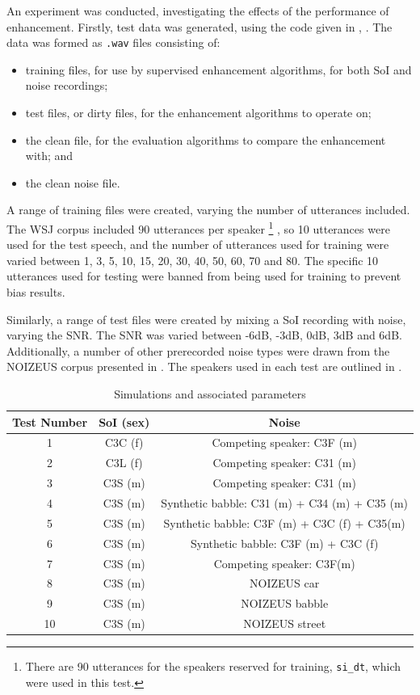 An experiment was conducted, investigating the effects of the performance
of enhancement. Firstly, test data was generated, using the code given
in , \textit{}.
The data was formed as \lstinline[language=bash]!.wav! files consisting
of:
\begin{itemize}
\item training files, for use by supervised enhancement algorithms, for
both \ac{SoI} and noise recordings;
\item test files, or dirty files, for the enhancement algorithms to operate
on;
\item the clean file, for the evaluation algorithms to compare the enhancement
with; and
\item the clean noise file.
\end{itemize}
A range of training files were created, varying the number of utterances
included. The \ac{WSJ} corpus included 90 utterances per speaker%
\footnote{There are 90 utterances for the speakers reserved for training, \lstinline[language=bash]!si_dt!,
which were used in this test.%
} \citep{Fransen1994}, so 10 utterances were used for the test speech,
and the number of utterances used for training were varied between
1, 3, 5, 10, 15, 20, 30, 40, 50, 60, 70 and 80. The specific 10 utterances
used for testing were banned from being used for training to prevent
bias results.

Similarly, a range of test files were created by mixing a \ac{SoI}
recording with noise, varying the \ac{SNR}. The \ac{SNR} was varied
between -6dB, -3dB, 0dB, 3dB and 6dB. Additionally, a number of other
prerecorded noise types were drawn from the NOIZEUS corpus presented
in \citep{Hu2006}. The speakers used in each test are outlined in
.

\begin{table}
\protect\caption{\label{tab:test-params}Simulations and associated parameters}


\begin{centering}
\begin{tabular}{|c|c|c|}
\hline 
Test Number & \ac{SoI} (sex) & Noise\tabularnewline
\hline 
\hline 
1 & C3C (f) & Competing speaker: C3F (m)\tabularnewline
\hline 
2 & C3L (f) & Competing speaker: C31 (m)\tabularnewline
\hline 
3 & C3S (m) & Competing speaker: C31 (m)\tabularnewline
\hline 
4 & C3S (m) & Synthetic babble: C31 (m) + C34 (m) + C35 (m)\tabularnewline
\hline 
5 & C3S (m) & Synthetic babble: C3F (m) + C3C (f) + C35(m)\tabularnewline
\hline 
6 & C3S (m) & Synthetic babble: C3F (m) + C3C (f)\tabularnewline
\hline 
7 & C3S (m) & Competing speaker: C3F(m)\tabularnewline
\hline 
8 & C3S (m) & NOIZEUS car\tabularnewline
\hline 
9 & C3S (m) & NOIZEUS babble\tabularnewline
\hline 
10 & C3S (m) & NOIZEUS street\tabularnewline
\hline 
\end{tabular}
\par\end{centering}

\end{table}


